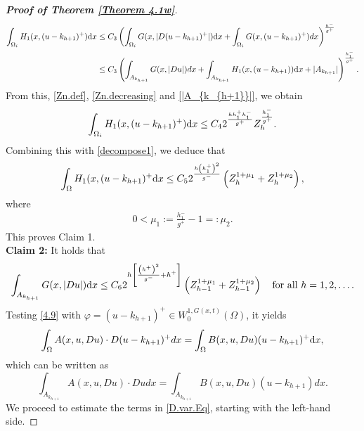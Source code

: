 \documentclass[10pt,reqno]{amsart}
\newcommand *\w{^\wedge}
\theoremstyle{definition}
\numberwithin{equation}{section}
\begin{document}
\begin{proof}[\textbf{Proof of Theorem \ref{Theorem 4.1w}}]
\begin{align*}
		\int_{\Omega_{i}}H_1(x,(u-k_{h+1})^+){\rm d}x&\leq C_3\left(\int_{\Omega_{i}}G(x,|D (u-k_{h+1})^+|){\rm d}x+\int_{\Omega_{i}}G(x,(u-k_{h+1})^+)d x\right)^{\frac{h^-}{g^+}}\\
		&\leq C_3\left(\int_{A_{k_{h+1}}}G(x,|D u|)d x+\int_{A_{k_{h+1}}}H_1(x,(u-k_{h+1})){\rm d}x+|A_{k_{h+1}}|\right)^{\frac{h^-_1}{g^+}}.
	\end{align*}
From this, \eqref{Zn.def}, \eqref{Zn.decreasing} and \eqref{|A_{k_{h+1}}|}, we obtain
	\begin{align*}%
		\int_{\Omega_{i}}H_1(x,(u-k_{h+1})^+){\rm d}x
		\leq C_42^{\frac{hh^+_1h^-_1}{g^+}}Z_{h}^{\frac{h^-_1}{g^+}}.
	\end{align*}
	Combining this with \eqref{decompose1}, we deduce that 
	\begin{equation*}
		\int_{\Omega}H_1(x,(u-k_{h+1})^+{\rm d}x
		\leq C_52^{\frac{h\left(h^+_1\right)^2}{g^-}}\left(Z_{h}^{1+\mu_1}+Z_{h}^{1+\mu_2}\right),
	\end{equation*}
	where
	\begin{align*}
		0<\mu_1:=\frac{h^-_1}{g^+}-1=:\mu_2.
	\end{align*}
 This proves Claim 1.\\
 {\bf Claim 2:} It hol{\rm d}s that
	\begin{equation*}
		\int_{A_{k_{h+1}}}G(x,|D u|){\rm d}x\leq  C_6 2^{h\left[\frac{\left(h^+\right)^2}{g^-}+h^+\right]}\left(Z_{h-1}^{1+\mu_1}+Z_{h-1}^{1+\mu_2}\right)\quad \text{for all }h=1,2,\ldots.
	\end{equation*}
Testing \eqref{4.9} with $\varphi =(u-k_{h+1})^{+} \in W_0^{1,G(x,t)}(\Omega)$, it yields 
	\begin{align*}
		\int_{\Omega} A(x,u,D u) \cdot D(u-k_{h+1})^{+} d x
		=\int_{\Omega }B(x,u,D u)(u-k_{h+1})^{+} {\rm d}x,
	\end{align*}
which can be written as
	\begin{equation}\label{D.var.Eq}
		\int_{A_{k_{h+1}}} A(x,u,D u) \cdot D u d x
		=\int_{A_{k_{h+1}} }B(x,u,D u)(u-k_{h+1}) d x.
	\end{equation}
We proceed to estimate the terms in \eqref{D.var.Eq}, starting with the left-hand side.


\end{proof}
\end{document}

